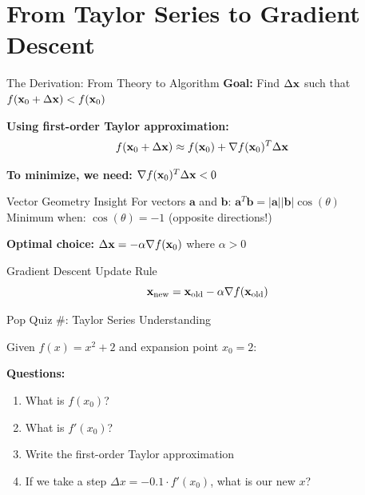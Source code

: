 \documentclass[usenames,dvipsnames]{beamer}
\begin{document}
  \section{From Taylor Series to Gradient Descent}

  \begin{frame}{The Derivation: From Theory to Algorithm}
    \textbf{Goal:} Find $\Delta \mathbf{x}$ such that $f(\mathbf{x}_0 + \Delta \mathbf{x}) < f(\mathbf{x}_0)$
    
    \pause
    \textbf{Using first-order Taylor approximation:}
    \begin{align}
        f(\mathbf{x}_0 + \Delta \mathbf{x}) &\approx f(\mathbf{x}_0) + \nabla f(\mathbf{x}_0)^T \Delta \mathbf{x}
    \end{align}
    
    \pause
    \textbf{To minimize, we need:} $\nabla f(\mathbf{x}_0)^T \Delta \mathbf{x} < 0$
    
    \pause
    \begin{examplebox}{Vector Geometry Insight}
    For vectors $\mathbf{a}$ and $\mathbf{b}$: $\mathbf{a}^T\mathbf{b} = |\mathbf{a}||\mathbf{b}|\cos(\theta)$
    \\Minimum when: $\cos(\theta) = -1$ (opposite directions!)
    \end{examplebox}
    
    \pause
    \textbf{Optimal choice:} $\Delta \mathbf{x} = -\alpha \nabla f(\mathbf{x}_0)$ where $\alpha > 0$
    
    \pause
    \begin{definitionbox}{Gradient Descent Update Rule}
    $$\mathbf{x}_{\text{new}} = \mathbf{x}_{\text{old}} - \alpha \nabla f(\mathbf{x}_{\text{old}})$$
    \end{definitionbox}
  \end{frame}

  \begin{frame}{Pop Quiz \#\thepopquiz: Taylor Series Understanding}
    \begin{popquizbox}{\thepopquiz}
    Given $f(x) = x^2 + 2$ and expansion point $x_0 = 2$:
    
    \textbf{Questions:}
    \begin{enumerate}
        \item What is $f(x_0)$?
        \item What is $f'(x_0)$?
        \item Write the first-order Taylor approximation
        \item If we take a step $\Delta x = -0.1 \cdot f'(x_0)$, what is our new $x$?
    \end{enumerate}
    \end{popquizbox}
  \end{frame}
\end{document}
